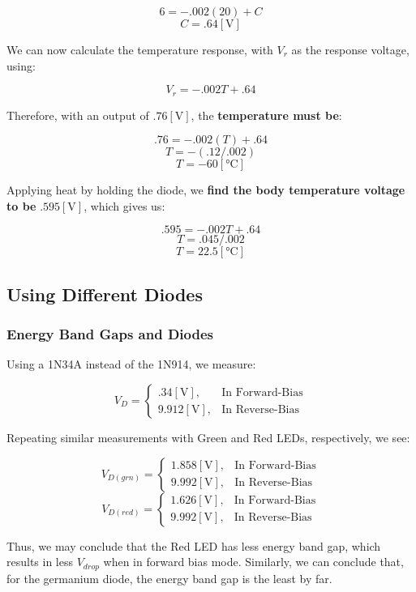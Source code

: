 \documentclass[
	letterpaper, %
	10pt, %
]{CSUniSchoolLabReport}
\begin{document}
    $$6=-.002(20)+C$$
    $$C=.64[\si{\volt}]$$

    We can now calculate the temperature response, with $V_r$ as the response voltage, using:

    $$V_r=-.002T+.64$$

    Therefore, with an output of $.76[\si{\volt}]$, the \textbf{temperature must be}:

    $$.76=-.002(T)+.64$$
    $$T=-(.12/.002)$$
    $$\boxed{T=-60[\si{\celsius}]}$$

    Applying heat by holding the diode, we \textbf{find the body temperature voltage to be} $.595[\si{\volt}]$, which gives us:

    $$.595=-.002T+.64$$
    $$T=.045/.002$$
    $$\boxed{T=22.5[\si{\celsius}]}$$

    \subsection{Using Different Diodes}

    \subsubsection{Energy Band Gaps and Diodes}

    Using a 1N34A instead of the 1N914, we measure:

    $$V_D=\left\{\begin{array}{ll} .34[\si{\volt}], & \text{In Forward-Bias}\\ 9.912[\si{\volt}], & \text{In Reverse-Bias}\end{array}$$

    Repeating similar measurements with Green and Red LEDs, respectively, we see:

    $$V_{D(grn)}=\left\{\begin{array}{ll} 1.858[\si{\volt}], & \text{In Forward-Bias}\\ 9.992[\si{\volt}], & \text{In Reverse-Bias}\end{array}$$
    $$V_{D(red)}=\left\{\begin{array}{ll} 1.626[\si{\volt}], & \text{In Forward-Bias}\\ 9.992[\si{\volt}], & \text{In Reverse-Bias}\end{array}$$

    Thus, we may conclude that the Red LED has less energy band gap, which results in less $V_{drop}$ when in forward bias mode. Similarly, we can conclude that, for the germanium diode, the energy band gap is the least by far.
\end{document}
